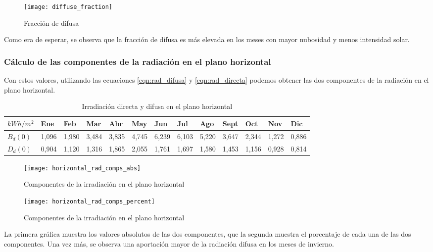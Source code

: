 \begin{figure}[H]
\texttt{[image: diffuse\_fraction]}
\centering
\caption{Fracción de difusa}
\label{fig:difuse_part}
\end{figure}

Como era de esperar, se observa que la fracción de difusa es más elevada en los meses con mayor nubosidad y menos intensidad solar.

\subsubsection{Cálculo de las componentes de la radiación  en el plano horizontal}

Con estos valores, utilizando las ecuaciones \ref{eqn:rad_difusa} y \ref{eqn:rad_directa} podemos obtener las dos componentes de la radiación en el plano horizontal.

\begin{table}[ht]
\centering
\begin{tabular}{|l|l|l|l|l|l|l|l|l|l|l|l|l|}
\hline
$kWh/m^2$  & Ene   & Feb   & Mar   & Abr   & May   & Jun   & Jul   & Ago   & Sept  & Oct   & Nov    & Dic    \\ \hline
$B_{d}(0)$ & 1,096 & 1,980 & 3,484 & 3,835 & 4,745 & 6,239 & 6,103 & 5,220 & 3,647 & 2,344 & 1,272  & 0,886  \\ \hline
$D_{d}(0)$ & 0,904 & 1,120 & 1,316 & 1,865 & 2,055 & 1,761 & 1,697 & 1,580 & 1,453 & 1,156 & 0,928  & 0,814  \\ \hline
\end{tabular}
\label{tab:rad_components}
\caption{Irradiación directa y difusa en el plano horizontal}
\end{table}

\begin{figure}[H]
\texttt{[image: horizontal\_rad\_comps\_abs]}
\centering
\caption{Componentes de la irradiación en el plano horizontal}
\label{fig:rad_components_abs}
\end{figure}

\begin{figure}[H]
\texttt{[image: horizontal\_rad\_comps\_percent]}
\centering
\caption{Componentes de la irradiación en el plano horizontal}
\label{fig:rad_components_percent}
\end{figure}

La primera gráfica muestra los valores absolutos de las dos componentes, que la segunda muestra el porcentaje de cada una de las dos componentes. Una vez más, se observa una aportación mayor de la radiación difusa en los meses de invierno.

